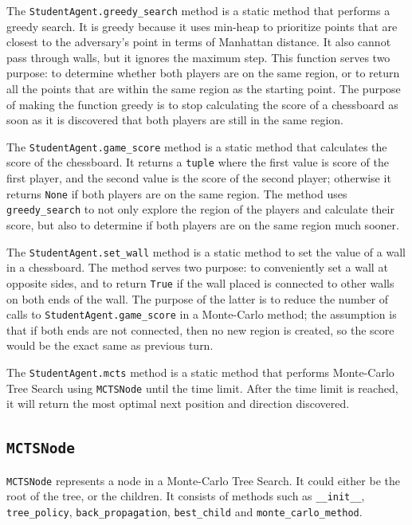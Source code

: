 \documentclass[twoside,11pt]{article}
\begin{document}
The \texttt{StudentAgent.greedy\_search} method is a static method that performs a greedy search.
It is greedy because it uses min-heap to prioritize points that are closest to the adversary's point in terms of Manhattan distance.
It also cannot pass through walls, but it ignores the maximum step.
This function serves two purpose: to determine whether both players are on the same region, or to return all the points that are within the same region as the starting point.
The purpose of making the function greedy is to stop calculating the score of a chessboard as soon as it is discovered that both players are still in the same region.

The \texttt{StudentAgent.game\_score} method is a static method that calculates the score of the chessboard.
It returns a \texttt{tuple} where the first value is score of the first player, and the second value is the score of the second player;
otherwise it returns \texttt{None} if both players are on the same region.
The method uses \texttt{greedy\_search} to not only explore the region of the players and calculate their score, but also to determine if both players are on the same region much sooner.

The \texttt{StudentAgent.set\_wall} method is a static method to set the value of a wall in a chessboard.
The method serves two purpose: to conveniently set a wall at opposite sides, and to return \texttt{True} if the wall placed is connected to other walls on both ends of the wall.
The purpose of the latter is to reduce the number of calls to \texttt{StudentAgent.game\_score} in a Monte-Carlo method;
the assumption is that if both ends are not connected, then no new region is created, so the score would be the exact same as previous turn.

The \texttt{StudentAgent.mcts} method is a static method that performs Monte-Carlo Tree Search using \texttt{MCTSNode} until the time limit.
After the time limit is reached, it will return the most optimal next position and direction discovered.

\subsection{\texttt{MCTSNode}}

\texttt{MCTSNode} represents a node in a Monte-Carlo Tree Search.
It could either be the root of the tree, or the children.
It consists of methods such as \texttt{\_\_init\_\_}, \texttt{tree\_policy}, \texttt{back\_propagation}, \texttt{best\_child} and \texttt{monte\_carlo\_method}.
\end{document}
